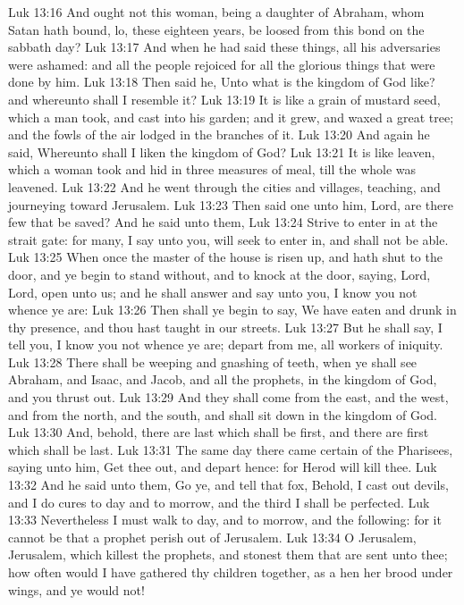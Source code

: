 \vs Luk 13:16 And ought not this woman, being a daughter of Abraham, whom Satan hath bound, lo, these eighteen years, be loosed from this bond on the sabbath day?
\vs Luk 13:17 And when he had said these things, all his adversaries were ashamed: and all the people rejoiced for all the glorious things that were done by him.
\vs Luk 13:18 Then said he, Unto what is the kingdom of God like? and whereunto shall I resemble it?
\vs Luk 13:19 It is like a grain of mustard seed, which a man took, and cast into his garden; and it grew, and waxed a great tree; and the fowls of the air lodged in the branches of it.
\vs Luk 13:20 And again he said, Whereunto shall I liken the kingdom of God?
\vs Luk 13:21 It is like leaven, which a woman took and hid in three measures of meal, till the whole was leavened.
\vs Luk 13:22 And he went through the cities and villages, teaching, and journeying toward Jerusalem.
\vs Luk 13:23 Then said one unto him, Lord, are there few that be saved? And he said unto them,
\vs Luk 13:24 Strive to enter in at the strait gate: for many, I say unto you, will seek to enter in, and shall not be able.
\vs Luk 13:25 When once the master of the house is risen up, and hath shut to the door, and ye begin to stand without, and to knock at the door, saying, Lord, Lord, open unto us; and he shall answer and say unto you, I know you not whence ye are:
\vs Luk 13:26 Then shall ye begin to say, We have eaten and drunk in thy presence, and thou hast taught in our streets.
\vs Luk 13:27 But he shall say, I tell you, I know you not whence ye are; depart from me, all  workers of iniquity.
\vs Luk 13:28 There shall be weeping and gnashing of teeth, when ye shall see Abraham, and Isaac, and Jacob, and all the prophets, in the kingdom of God, and you  thrust out.
\vs Luk 13:29 And they shall come from the east, and  the west, and from the north, and  the south, and shall sit down in the kingdom of God.
\vs Luk 13:30 And, behold, there are last which shall be first, and there are first which shall be last.
\vs Luk 13:31 The same day there came certain of the Pharisees, saying unto him, Get thee out, and depart hence: for Herod will kill thee.
\vs Luk 13:32 And he said unto them, Go ye, and tell that fox, Behold, I cast out devils, and I do cures to day and to morrow, and the third  I shall be perfected.
\vs Luk 13:33 Nevertheless I must walk to day, and to morrow, and the  following: for it cannot be that a prophet perish out of Jerusalem.
\vs Luk 13:34 O Jerusalem, Jerusalem, which killest the prophets, and stonest them that are sent unto thee; how often would I have gathered thy children together, as a hen  her brood under  wings, and ye would not!
